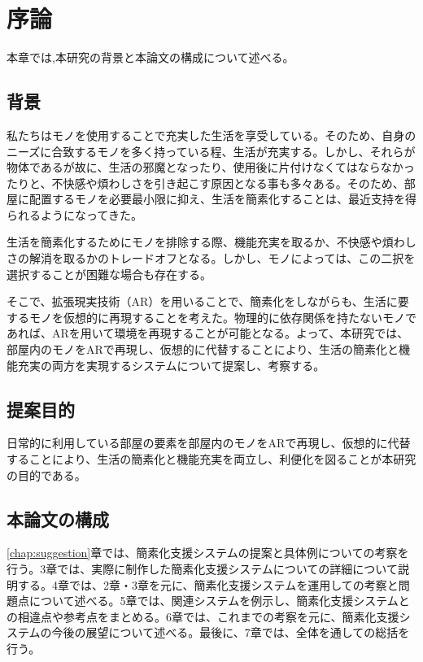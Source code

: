 \chapter{序論}
\label{chap:introduction}

本章では,本研究の背景と本論文の構成について述べる。

\newpage

\section{背景}

私たちはモノを使用することで充実した生活を享受している。そのため、自身のニーズに合致するモノを多く持っている程、生活が充実する。しかし、それらが物体であるが故に、生活の邪魔となったり、使用後に片付けなくてはならなかったりと、不快感や煩わしさを引き起こす原因となる事も多々ある。そのため、部屋に配置するモノを必要最小限に抑え、生活を簡素化することは、最近支持を得られるようになってきた。

生活を簡素化するためにモノを排除する際、機能充実を取るか、不快感や煩わしさの解消を取るかのトレードオフとなる。しかし、モノによっては、この二択を選択することが困難な場合も存在する。

そこで、拡張現実技術（AR）を用いることで、簡素化をしながらも、生活に要するモノを仮想的に再現することを考えた。物理的に依存関係を持たないモノであれば、ARを用いて環境を再現することが可能となる。よって、本研究では、部屋内のモノをARで再現し、仮想的に代替することにより、生活の簡素化と機能充実の両方を実現するシステムについて提案し、考察する。

\section{提案目的}

日常的に利用している部屋の要素を部屋内のモノをARで再現し、仮想的に代替することにより、生活の簡素化と機能充実を両立し、利便化を図ることが本研究の目的である。

\section{本論文の構成}

\ref{chap:suggestion}章では、簡素化支援システムの提案と具体例についての考察を行う。3章では、実際に制作した簡素化支援システムについての詳細について説明する。4章では、2章・3章を元に、簡素化支援システムを運用しての考察と問題点について述べる。5章では、関連システムを例示し、簡素化支援システムとの相違点や参考点をまとめる。6章では、これまでの考察を元に、簡素化支援システムの今後の展望について述べる。最後に、7章では、全体を通しての総括を行う。
